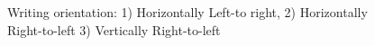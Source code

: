     \begin{figure}[H]
      \centering
      \caption{Writing orientation: 1) Horizontally Left-to right, 2) Horizontally Right-to-left 3) Vertically Right-to-left}
    \end{figure}

